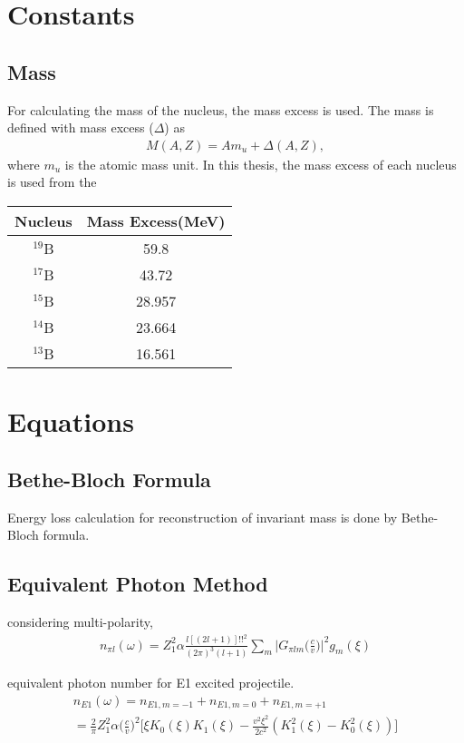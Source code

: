 \appendix

\chapter{Constants}
\section{Mass}
For calculating the mass of the nucleus, the mass excess is used. The mass is defined with mass excess ($\Delta$) as
\begin{align}
    M(A,Z) = A m_u + \Delta(A,Z),
\end{align}
where $m_u$ is the atomic mass unit. In this thesis, the mass excess of each nucleus is used from the ~~
\begin{table}[h]
    \centering
    \begin{tabular}{c|c}
        \hline \hline
        Nucleus & Mass Excess(MeV) \\
        \hline
        ${}^{19}$B & 59.8 \\
        ${}^{17}$B & 43.72 \\
        ${}^{15}$B & 28.957 \\
        ${}^{14}$B & 23.664 \\
        ${}^{13}$B & 16.561 \\
        \hline \hline       
    \end{tabular}
\end{table}

\chapter{Equations}
\section{Bethe-Bloch Formula}
Energy loss calculation for reconstruction of invariant mass is done by Bethe-Bloch formula. 

\section{Equivalent Photon Method}
considering multi-polarity, 
\begin{align}
    n_{\pi l}(\omega)=Z^{2}_{1} \alpha \frac{l[(2l+1)]!!^{2}}{(2\pi)^{3}(l+1)}\sum_{m}\Big|G_{\pi l m}\big( \frac{c}{v}\big) \Big|^{2} g_{m}(\xi)
\end{align} 

equivalent photon number for E1 excited projectile.
\begin{align}
    n_{E1}(\omega)=n_{E1, m=-1}+n_{E1, m=0}+n_{E1, m=+1}\\
    =\frac{2}{\pi}Z^{2}_{1}\alpha\Big(\frac{c}{v}\Big)^{2}\Big[ \xi K_{0}(\xi)K_{1}(\xi)-\frac{v^{2}\xi^{2}}{2c^{2}}(K^{2}_{1}(\xi)-K^{2}_{0}(\xi)) \Big]
\end{align}


